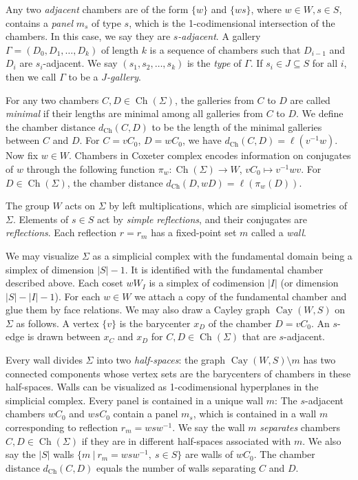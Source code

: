 \documentclass[a4paper, reqno, 14pt]{amsart}
\def\i{{^{-1}}}
\def\subset{\subseteq}
\DeclareMathOperator{\Ch}{Ch}
\DeclareMathOperator{\Cay}{Cay}
\theoremstyle{definition}
\theoremstyle{remark}
\numberwithin{equation}{section}
\numberwithin{thm}{section}
\begin{document}
Any two \emph{adjacent} chambers are of the form $\{w\}$ and $\{ws\}$, where $w\in W, s\in S$, contains a \emph{panel} $m_s$ of type $s$, which is the 1-codimensional intersection of the chambers. In this case, we say they are \emph{$s$-adjacent}. A gallery $\Gamma=(D_0,D_1,\dots,D_k)$ of length $k$ is a sequence of chambers such that $D_{i-1}$ and $D_i$ are $s_i$-adjacent. We say $(s_1,s_2,\dots,s_k)$ is the \emph{type} of $\Gamma$. If $s_i\in J\subset S$ for all $i$, then we call $\Gamma$ to be a \emph{$J$-gallery}.

For any two chambers $C,D\in \Ch(\Sigma)$, the galleries from $C$ to $D$ are called \emph{minimal} if their lengths are minimal among all galleries from $C$ to $D$. We define the chamber distance $d_{\Ch}(C,D)$ to be the length of the minimal galleries between $C$ and $D$. For $C=vC_0$, $D=wC_0$, we have $d_{\Ch}(C,D)=\ell(v\i w)$. Now fix $w\in W$. Chambers in Coxeter complex encodes information on conjugates of $w$ through the following function $\pi_w:\Ch(\Sigma)\to W$, $v C_0\mapsto v\i wv$. For $D\in \Ch(\Sigma)$, the chamber distance $d_{\Ch}(D,wD)=\ell(\pi_w(D))$.

The group $W$ acts on $\Sigma$ by left multiplications, which are simplicial isometries of $\Sigma$. Elements of $s\in S$ act by \emph{simple reflections}, and their conjugates are \emph{reflections}. Each reflection $r=r_m$ has a fixed-point set $m$ called a \emph{wall}.  

We may visualize $\Sigma$ as a simplicial complex with the fundamental domain being a simplex of dimension $|S|-1$. It is identified with the fundamental chamber described above. Each coset $wW_I$ is a simplex of codimension $|I|$ (or dimension $|S|-|I|-1$).  For each $w\in W$ we attach a copy of the fundamental chamber and glue them by face relations. We may also draw a Cayley graph $\Cay(W,S)$ on $\Sigma$ as follows. A vertex $\{v\}$ is the barycenter $x_D$ of the chamber $D=vC_0$. An $s$-edge is drawn between $x_C$ and $x_D$ for $C,D\in \Ch(\Sigma)$ that are $s$-adjacent. 

Every wall divides $\Sigma$ into two \emph{half-spaces}: the graph $\Cay(W,S)\setminus m$ has two connected components whose vertex sets are the barycenters of chambers in these half-spaces. Walls can be visualized as 1-codimensional hyperplanes in the simplicial complex. Every panel is contained in a unique wall $m$: The $s$-adjacent chambers $wC_0$ and $wsC_0$ contain a panel $m_s$, which is contained in a wall $m$ corresponding to reflection $r_m=wsw\i$. We say the wall $m$ \emph{separates} chambers $C,D\in \Ch(\Sigma)$ if they are in different half-spaces associated with $m$. We also say the $|S|$ walls $\{m\ |\ r_m=wsw\i,\ s\in S\}$ are walls of $wC_0$. The chamber distance $d_{\Ch}(C,D)$ equals the number of walls separating $C$ and $D$. 
\end{document}
